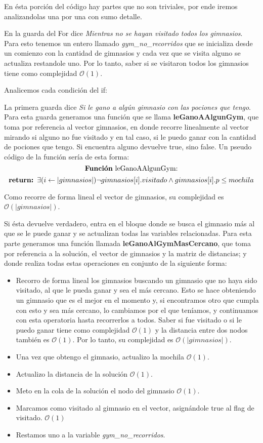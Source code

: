 En ésta porción del código hay partes que no son triviales, por ende iremos analizandolas una por una con sumo detalle.

En la guarda del For dice \textit{Mientras no se hayan visitado todos los gimnasios}. Para esto tenemos un entero llamado \emph{gym\_no\_recorridos} que se inicializa desde un comienzo con la cantidad de gimnasios y cada vez que se visita alguno se actualiza restandole uno. Por lo tanto, saber si se visitaron todos los gimnasios tiene como complejidad $\mathcal{O}(1)$.

Analicemos cada condición del if:

La primera guarda dice \textit{Si le gano a algún gimnasio con las pociones que tengo}. Para esta guarda generamos una función que se llama \textbf{leGanoAAlgunGym}, que toma por referencia al vector gimnasios, en donde recorre linealmente al vector mirando si alguno no fue visitado y en tal caso, si le puedo ganar con la cantidad de pociones que tengo. Si encuentra alguno devuelve true, sino false.
Un pseudo código de la función sería de esta forma:
\[
	\text{\textbf{Función} leGanoAAlgunGym:}
\]
\[
	\text{\textbf{return: }} \exists (i \leftarrow |gimnasios|) \neg gimnasios[i].visitado \land gimnasios[i].p \leq mochila
\]

Como recorre de forma lineal el vector de gimnasios, su complejidad es $\mathcal{O}(|gimnasios|)$.

Si ésta devuelve verdadero, entra en el bloque donde  se busca el gimnasio más al que se le puede ganar y se actualizan todas las variables relacionadas. Para esta parte generamos una función llamada \textbf{leGanoAlGymMasCercano}, que toma por referencia a la solución, el vector de gimnasios y la matriz de distancias; y donde realiza todas estas operaciones en conjunto de la siguiente forma:

\begin{itemize}
	\item Recorro de forma lineal los gimnasios buscando un gimnasio que no haya sido visitado, al que le pueda ganar y sea el más cercano. Esto se hace obteniendo un gimnasio que es el mejor en el momento y, si encontramos otro que cumpla con esto y sea más cercano, lo cambiamos por el que teníamos, y continuamos con esta operatoria hasta recorrerlos a todos. Saber si fue visitado o si le puedo ganar tiene como complejidad $\mathcal{O}(1)$ y la distancia entre dos nodos también es $\mathcal{O}(1)$. Por lo tanto, su complejidad es $\mathcal{O}(|gimnasios|)$.
	\item Una vez que obtengo el gimnasio, actualizo la mochila $\mathcal{O}(1)$.
	\item Actualizo la distancia de la solución $\mathcal{O}(1)$.
	\item Meto en la cola de la solución el nodo del gimnasio $\mathcal{O}(1)$.
	\item Marcamos como visitado al gimnasio en el vector, asignándole true al flag de visitado. $\mathcal{O}(1)$
	\item Restamos uno a la variable \emph{gym\_no\_recorridos}.
\end{itemize}

